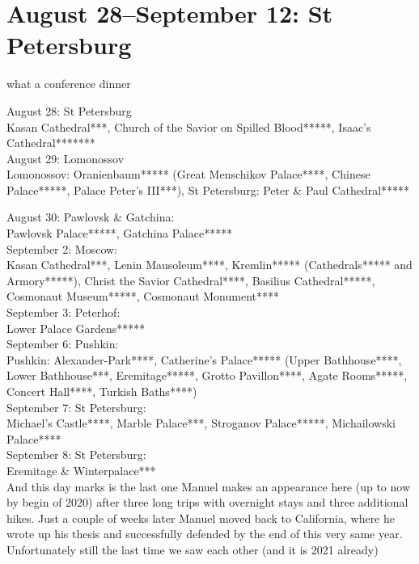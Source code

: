 \section{August 28--September 12: St Petersburg}
\label{2015:StPetersburg}
what a conference dinner

August 28: St Petersburg\\
Kasan Cathedral***, Church of the Savior on Spilled Blood*****, Isaac's Cathedral*******\\

August 29: Lomonossov\\
Lomonossov: Oranienbaum***** (Great Menschikov Palace****, Chinese Palace*****, Palace Peter's III***), St Petersburg: Peter \& Paul Cathedral*****

August 30: Pawlovsk \& Gatchina:\\
Pawlovsk Palace*****, Gatchina Palace*****\\

September 2: Moscow:\\
Kasan Cathedral***, Lenin Mausoleum****, Kremlin***** (Cathedrals***** and Armory*****), Christ the Savior Cathedral****, Basilius Cathedral*****, Cosmonaut Museum*****, Cosmonaut Monument****\\

September 3: Peterhof:\\
Lower Palace Gardens*****\\

September 6: Pushkin:\\
Pushkin: Alexander-Park****, Catherine's Palace***** (Upper Bathhouse****, Lower Bathhouse***, Eremitage*****, Grotto Pavillon****, Agate Rooms*****, Concert Hall****, Turkish Baths****)\\

September 7: St Petersburg:\\
Michael's Castle****, Marble Palace***, Stroganov Palace*****, Michailowski Palace****\\

September 8: St Petersburg:\\
Eremitage \& Winterpalace***\\

And this day marks is the last one Manuel makes an appearance here (up to now by begin of 2020) after three long trips with overnight stays and three additional hikes. Just a couple of weeks later Manuel moved back to California, where he wrote up his thesis and successfully defended by the end of this very same year. Unfortunately still the last time we saw each other (and it is 2021 already)\\

